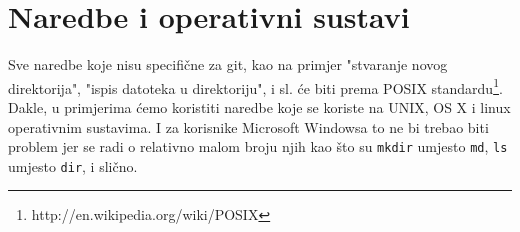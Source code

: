 \section*{Naredbe i operativni sustavi}

Sve naredbe koje nisu specifične za git, kao na primjer "stvaranje novog direktorija", "ispis datoteka u direktoriju", i sl. će biti prema POSIX standardu\footnote{http://en.wikipedia.org/wiki/POSIX}.
Dakle, u primjerima ćemo koristiti naredbe koje se koriste na UNIX, OS X i linux operativnim sustavima. 
I za korisnike Microsoft Windowsa to ne bi trebao biti problem jer se radi o relativno malom broju njih kao što su \verb+mkdir+ umjesto \verb+md+, \verb+ls+ umjesto \verb+dir+, i slično.
